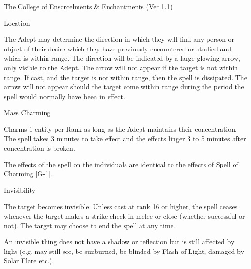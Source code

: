 \begin{Chapter}{The College of Ensorcelments \& Enchantments (Ver 1.1)}
\begin{spell}[G-6]{Location}

\begin{effects}
The Adept may determine the direction in which they will find any
person or object of their desire which they have previously
encountered or studied and which is within range.  The direction will
be indicated by a large glowing arrow, only visible to the Adept.  The
arrow will not appear if the target is not within range. If cast, and
the target is not within range, then the spell is dissipated. The
arrow will not appear should the target come within range during the
period the spell would normally have been in effect.
\end{effects}
\end{spell}

\begin{spell}[G-7]{Mass Charming}

\begin{effects}
Charms 1 entity per Rank as long as the Adept maintains their
concentration.  The spell takes 3 minutes to take effect and the
effects linger 3 to 5 minutes after concentration is broken.

The effects of the spell on the individuals are identical to the
effects of Spell of Charming [G-1].
\end{effects}
\end{spell}

\begin{spell}[G-8]{Invisibility}
\begin{effects}
The target becomes invisible.  Unless cast at rank 16 or higher, the
spell ceases whenever the target makes a strike check in melee or
close (whether successful or not). The target may choose to end the
spell at any time.

An invisible thing does not have a shadow or reflection but is still
affected by light (e.g.  may still see, be sunburned, be blinded by
Flash of Light, damaged by Solar Flare etc.).


\end{effects}
\end{spell}
\end{Chapter}
